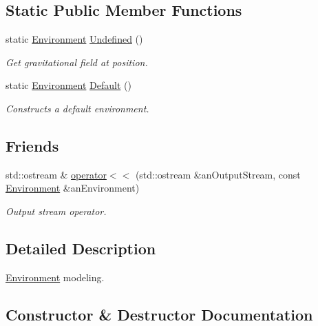 \subsection*{Static Public Member Functions}
\begin{DoxyCompactItemize}
\item 
static \hyperlink{classostk_1_1physics_1_1_environment}{Environment} \hyperlink{classostk_1_1physics_1_1_environment_a0a6b08b9a19de02e9eeacdb0fcc0c588}{Undefined} ()
\begin{DoxyCompactList}\small\item\em Get gravitational field at position. \end{DoxyCompactList}\item 
static \hyperlink{classostk_1_1physics_1_1_environment}{Environment} \hyperlink{classostk_1_1physics_1_1_environment_af713ff358f251bedc1c837e3efac59a4}{Default} ()
\begin{DoxyCompactList}\small\item\em Constructs a default environment. \end{DoxyCompactList}\end{DoxyCompactItemize}
\subsection*{Friends}
\begin{DoxyCompactItemize}
\item 
std\+::ostream \& \hyperlink{classostk_1_1physics_1_1_environment_a7bc4b39898452fbe5ce3a8de75ad2596}{operator$<$$<$} (std\+::ostream \&an\+Output\+Stream, const \hyperlink{classostk_1_1physics_1_1_environment}{Environment} \&an\+Environment)
\begin{DoxyCompactList}\small\item\em Output stream operator. \end{DoxyCompactList}\end{DoxyCompactItemize}


\subsection{Detailed Description}
\hyperlink{classostk_1_1physics_1_1_environment}{Environment} modeling. 

\subsection{Constructor \& Destructor Documentation}
\mbox{\label{classostk_1_1physics_1_1_environment_a9c721c6c5eba3608b2225922ab498c95}} 
